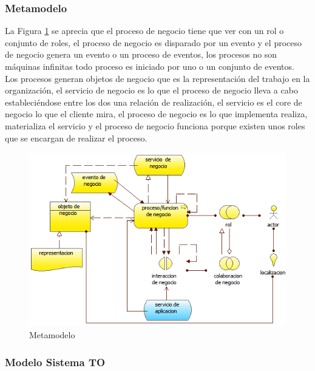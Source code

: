     \subsubsection{Metamodelo}
    La Figura \ref{metamodelo4} se aprecia que el proceso de negocio tiene que ver con un rol o conjunto de roles, el proceso de negocio es disparado por un evento y el proceso de   negocio genera un evento o un proceso de eventos, los procesos no son máquinas infinitas todo proceso es
    iniciado por uno o un conjunto de eventos.\\
    Los procesos generan objetos de negocio que es la representación del trabajo en la organización,  el servicio de negocio es lo que el proceso de negocio lleva a cabo   estableciéndose entre los dos una relación de realización, el servicio es el core de negocio lo que el cliente mira, el proceso de negocio es lo que implementa realiza,  materializa el servicio y el proceso de negocio funciona porque existen unos roles que se encargan de realizar el proceso. \cite{ref9}
    \begin{figure}[h]
      \centering
      \includegraphics{Imagenes/Metamodelos/04}
      \caption{Metamodelo}
      \label{metamodelo4}
    \end{figure}
\subsubsection{Modelo Sistema TO}
